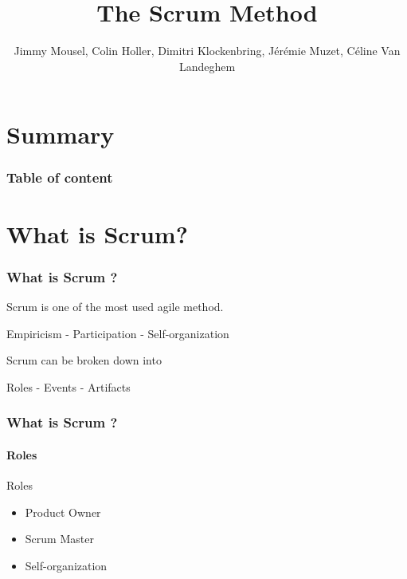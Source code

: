 \documentclass{beamer}
\title{The Scrum Method}
\author{Jimmy Mousel, Colin Holler, Dimitri Klockenbring, Jérémie Muzet, Céline Van Landeghem}
\date{}
\begin{document}
\frame{\titlepage}

\section{Summary}

\begin{frame}
    \frametitle{Table of content}
    
    \tableofcontents
\end{frame}

\section{What is Scrum?}

\begin{frame}
    \frametitle{What is Scrum ?}
    
    \begin{block}
         Scrum is one of the most used agile method.
        \begin{center}
             Empiricism  - Participation  - Self-organization
        \end{center}

    \end{block}

    \pause
    
    \begin{block}
         Scrum can be broken down into
        
        \begin{center}
             Roles  - Events  - Artifacts
        \end{center}
    \end{block}
    
\end{frame}

\begin{frame}
    \frametitle{What is Scrum ?}
    
    \framesubtitle{Roles}
    
    \begin{block}{Roles}
        \begin{itemize}
            \item Product Owner
            
            \item Scrum Master
            
            \item Self-organization
        \end{itemize}
    \end{block}
\end{frame}
\end{document}

